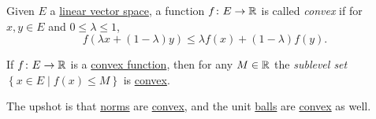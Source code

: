 \begin{definition}\label{def:convex-function}
	Given \(E\) a \hyperref[def:linear-vector-space]{linear vector space}, a function \(f\colon E\to \mathbb{\MakeUppercase{r}} \) is called \emph{convex} if for \(x, y\in E\) and \(0 \leq \lambda \leq 1\),
	\[
		f(\lambda x + (1 - \lambda )y) \leq \lambda f(x) + (1 - \lambda )f(y).
	\]
\end{definition}

\begin{remark}
	If \(f\colon E \to \mathbb{\MakeUppercase{r}} \) is a \hyperref[def:convex-function]{convex function}, then for any \(M\in \mathbb{\MakeUppercase{r}} \) the \emph{sublevel set} \(\left\{ x\in E\mid f(x) \leq M \right\} \) is \hyperref[def:convex-set]{convex}.
\end{remark}

The upshot is that \hyperref[def:norm]{norms} are \hyperref[def:convex-function]{convex}, and the unit \hyperref[def:ball]{balls} are \hyperref[def:convex-set]{convex} as well.
